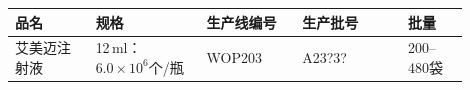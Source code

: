 \documentclass[UTF8,10pt,a4paper,fontset=fandol]{ctexart}
\newcommand{\fieldvalue}[1]{#1}
\newcommand{\handwritten}[1]{#1}
\begin{document}
\noindent
\begin{tabular}{|p{0.16\linewidth}|p{0.22\linewidth}|p{0.19\linewidth}|p{0.21\linewidth}|p{0.12\linewidth}|}
\hline
品名 & 规格 & 生产线编号 & 生产批号 & 批量 \\
\hline
\fieldvalue{艾美迈注射液} &
\fieldvalue{12\,ml：$6.0\times10^{6}$个/瓶} &
\fieldvalue{\handwritten{WOP203}} &
\fieldvalue{\handwritten{A23?3?}} &
\fieldvalue{200--480袋} \\
\hline
\end{tabular}

\vspace{0.4em}
\end{document}
